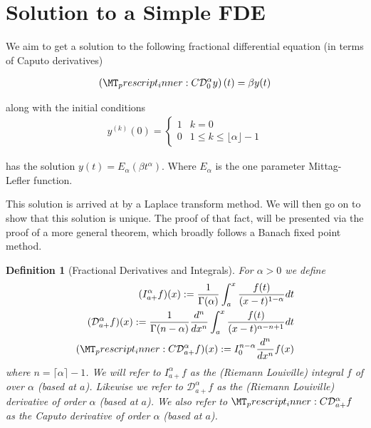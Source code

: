 \documentclass{article}
\begin{document}
\setlength\parindent{0pt}
\setlength{\parskip}{5mm plus4mm minus3mm}
\fancyfoot[r]{\today}
\newtheorem{theorem}{Theorem}
\newtheorem{lemma}{Lemma}
\newtheorem{definition}{Definition}
\newtheorem{corollary}{Corollary}
\newcommand{\laplace}[1]{ \mathcal{L} \left\{ #1 \right\} }
\newcommand{\rld}[3]{ \left( \mathcal{D}_{#1}^{#2} #3 \right) }
\newcommand{\rli}[3]{ \left( I_{#1}^{#2} #3 \right) }
\newcommand{\der}[3]{ \frac{d^{#3}#1}{d#2^{#3}} }
\newcommand{\capder}[3]{ \left( \prescript{C}{}{\mathcal{D}_{#1}^{#2}} #3 \right) }
\section*{Solution to a Simple FDE}

We aim to get a solution to the following fractional differential equation (in terms of Caputo derivatives)


\begin{align}
	\label{eq:fde-1}
	\left( \prescript{C}{}{\mathcal{D}_0^\alpha}y \right)(t) = \beta y(t) 
\end{align}

along with the initial conditions 
\begin{align}
	\label{eq:fde-1-ic}
	y^{(k)}(0) = 
	\begin{cases}
		1 & k = 0 \\
		0 & 1 \leq k \leq \lfloor \alpha \rfloor - 1  
	\end{cases}
\end{align}

has the solution $ y(t) = E_\alpha \left( \beta t^\alpha \right) $. Where $ E_\alpha $ is the one parameter Mittag-Lefler function.

This solution is arrived at by a Laplace transform method. We will then go on to show that this solution is unique. The proof of that fact, will be 
presented via the proof of a more general theorem, which broadly follows a Banach fixed point method. 

\begin{definition}[Fractional Derivatives and Integrals]
	For $ \alpha > 0 $ we define
	\begin{align*}
		(I_{a+}^{\alpha}f)(x) := \frac{1}{\Gamma(\alpha)}\int_a^x \frac{f(t)}{(x-t)^{1 - \alpha}} dt \\
		(\mathcal{D}_{a+}^{\alpha}f)(x) := \frac{1}{\Gamma(n-\alpha)} \frac{d^n}{dx^n}\int_a^x \frac{f(t)}{(x-t)^{\alpha - n + 1}} dt \\
		(\prescript{C}{}{\mathcal{D}}_{a+}^\alpha f)(x) := I_{0}^{n-\alpha} \frac{d^n}{dx^n}f(x) 
	\end{align*}
	where $ n  = \lceil \alpha \rceil - 1$.
	We will refer to $ I_{a+}^\alpha f$ as the (Riemann Louiville) integral $ f $ of over $ \alpha $ (based at $ a $).
	Likewise we refer to $ \mathcal{D}_{a+}^\alpha f $ as the (Riemann Louiville) derivative of order $ \alpha $ (based at $ a $).
	We also refer to $ \prescript{C}{}{\mathcal{D}}_{a+}^\alpha f $ as the Caputo derivative of order $ \alpha $ (based at $ a $).
	
\end{definition}
\end{document}
